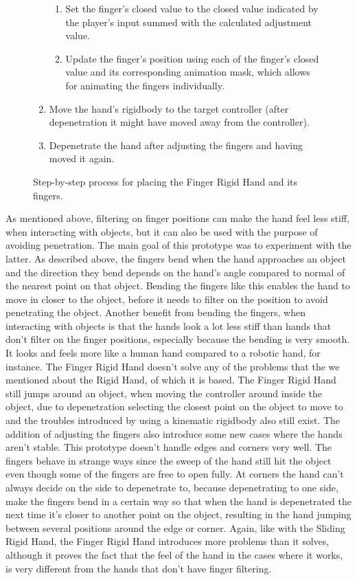 \begin{figure}[H]
\begin{enumerate}[noitemsep]
\begin{enumerate}[noitemsep]
\item Set the finger's closed value to the closed value indicated by the player's input summed with the calculated adjustment value.
\item Update the finger's position using each of the finger's closed value and its corresponding animation mask, which allows for animating the fingers individually.
\end{enumerate}
\item Move the hand's rigidbody to the target controller (after depenetration it might have moved away from the controller).
\item Depenetrate the hand after adjusting the fingers and having moved it again.
\end{enumerate}
\caption{Step-by-step process for placing the Finger Rigid Hand and its fingers.}
\label{fig:stepByStepFingerRigidHand}
\end{figure}

As mentioned above, filtering on finger positions can make the hand feel less stiff, when interacting with objects, but it can also be used with the purpose of avoiding penetration. The main goal of this prototype was to experiment with the latter. As described above, the fingers bend when the hand approaches an object and the direction they bend depends on the hand's angle compared to normal of the nearest point on that object. Bending the fingers like this enables the hand to move in closer to the object, before it needs to filter on the position to avoid penetrating the object. Another benefit from bending the fingers, when interacting with objects is that the hands look a lot less stiff than hands that don't filter on the finger positions, especially because the bending is very smooth. It looks and feels more like a human hand compared to a robotic hand, for instance. The Finger Rigid Hand doesn't solve any of the problems that the we mentioned about the Rigid Hand, of which it is based. The Finger Rigid Hand still jumps around an object, when moving the controller around inside the object, due to depenetration selecting the closest point on the object to move to and the troubles introduced by using a kinematic rigidbody also still exist. The addition of adjusting the fingers also introduce some new cases where the hands aren't stable. This prototype doesn't handle edges and corners very well. The fingers behave in strange ways since the sweep of the hand still hit the object even though some of the fingers are free to open fully. At corners the hand can't always decide on the side to depenetrate to, because depenetrating to one side, make the fingers bend in a certain way so that when the hand is depenetrated the next time it's closer to another point on the object, resulting in the hand jumping between several positions around the edge or corner. Again, like with the Sliding Rigid Hand, the Finger Rigid Hand introduces more problems than it solves, although it proves the fact that the feel of the hand in the cases where it works, is very different from the hands that don't have finger filtering.

